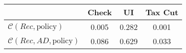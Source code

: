 \begin{tabular}{@{}lccc@{}} 
\toprule 
                          & Check      & UI    & Tax Cut    \\  \midrule 
$\mathcal{C}(Rec,\text{policy})$ & 0.005  & 0.282  & 0.001     \\ 
$\mathcal{C}(Rec, AD,\text{policy})$ & 0.086  & 0.629  & 0.033     \\ 
\end{tabular}  
